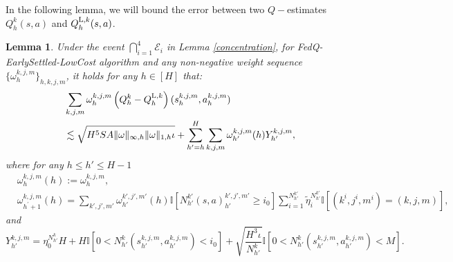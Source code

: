 \documentclass{article}
\newtheorem{lemma}{Lemma}[section]
\newcommand{\LL}{\textnormal{L}}
\begin{document}
In the following lemma, we will bound the error between two $Q-$estimates $Q_h^k(s,a)$ and $Q_h^{\LL,k}(s,a)$. 
\begin{lemma}
\label{recurQ}
Under the event $\bigcap_{i=1}^{4}\mathcal{E}_i$ in Lemma \ref{concentration}, for FedQ-EarlySettled-LowCost algorithm and any non-negative weight sequence $\{\omega_{h}^{k, j, m}\}_{h,k,j,m}$, it holds for any $h \in [H]$ that:
\begin{align*}
         &\sum_{k,j,m} \omega_{h}^{k,j,m} \left(Q_h^k - Q_h^{\LL,k}\right)(s_h^{k,j,m}, a_h^{k,j,m}) \nonumber\\
         &\lesssim \sqrt{H^5SA\|\omega\|_{\infty,h}\|\omega\|_{1,h}\iota}   + \sum_{h' = h}^{H}\sum_{k,j,m} \omega_{h'}^{k,j,m}(h)Y_{h'}^{k,j,m},
\end{align*}
where for any $ h \leq h' \leq H-1$
\begin{align*}
    &\omega_{h}^{k,j,m}(h) := \omega_{h}^{k,j,m}, \nonumber\\  
    &\omega_{h^\prime+1}^{k,j,m}(h)  = \sum_{k',j',m'}\omega_{h'}^{k',j',m'}(h)\mathbb{I}\left[N_{h'}^{k'}(s,a)_{h'}^{k',j',m'} \geq i_0 \right]\sum_{i = 1}^{N_{h'}^{k'}}\tilde{\eta}_i^{N_{h'}^{k'}}\mathbb{I}\left[(k^i,j^i,m^i) = (k,j,m) \right],
\end{align*} 
and
$$Y_{h'}^{k,j,m} = \eta_0^{N_{h'}^k}H + H\mathbb{I}[0<N_{h'}^k(s_{{h'}}^{k,j,m},a_{{h'}}^{k,j,m}) <i_0 ]+\sqrt{\frac{H^3\iota}{N_{h'}^k}}\mathbb{I}[ 0<N_{h'}^k(s_{{h'}}^{k,j,m},a_{{h'}}^{k,j,m})< M].$$
\end{lemma}
\end{document}
